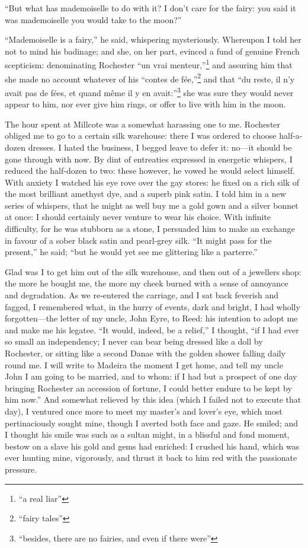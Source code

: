 \enquote{But what has mademoiselle to do with it?  I don't care for the
fairy: you said it was mademoiselle you would take to the moon?}

\enquote{Mademoiselle is a fairy,} he said, whispering mysteriously. 
Whereupon I told her not to mind his badinage; and she, on her part,
evinced a fund of genuine French scepticism: denominating \Mr{} Rochester
\foreignquote{french}{un vrai menteur,}\footnote{\enquote{a real liar}} and assuring him that she made no account
whatever of his \foreignquote{french}{contes de fée,}\footnote{\enquote{fairy tales}} and that \foreignquote{french}{du reste, il
n'y avait pas de fées, et quand même il y en avait:}\footnote{
\enquote{besides, there are no fairies, and even if there were}} she was sure they
would never appear to him, nor ever give him rings, or offer to live
with him in the moon.

The hour spent at Millcote was a somewhat harassing one to me.  \Mr{}
 Rochester obliged me to go to a certain silk warehouse: there I was
ordered to choose half-a-dozen dresses.  I hated the business, I begged
leave to defer it: no---it should be gone through with now.  By dint of
entreaties expressed in energetic whispers, I reduced the half-dozen to
two: these however, he vowed he would select himself.  With anxiety I
watched his eye rove over the gay stores: he fixed on a rich silk of the
most brilliant amethyst dye, and a superb pink satin.  I told him in a
new series of whispers, that he might as well buy me a gold gown and a
silver bonnet at once: I should certainly never venture to wear his
choice.  With infinite difficulty, for he was stubborn as a stone, I
persuaded him to make an exchange in favour of a sober black satin and
pearl-grey silk.  \enquote{It might pass for the present,} he said;
\enquote{but he would yet see me glittering like a parterre.}

Glad was I to get him out of the silk warehouse, and then out of a
jewellers shop: the more he bought me, the more my cheek burned with a
sense of annoyance and degradation.  As we re-entered the carriage, and
I sat back feverish and fagged, I remembered what, in the hurry of
events, dark and bright, I had wholly forgotten---the letter of my
uncle, John Eyre, to \Mrs{} Reed: his intention to adopt me and make me
his legatee.  \enquote{It would, indeed, be a relief,} I thought,
\enquote{if I had ever so small an independency; I never can bear being
dressed like a doll by \Mr{} Rochester, or sitting like a second Danae
with the golden shower falling daily round me.  I will write to Madeira
the moment I get home, and tell my uncle John I am going to be married,
and to whom: if I had but a prospect of one day bringing \Mr{} Rochester
an accession of fortune, I could better endure to be kept by him now.} 
And somewhat relieved by this idea (which I failed not to execute that
day), I ventured once more to meet my master's and lover's eye, which
most pertinaciously sought mine, though I averted both face and gaze. 
He smiled; and I thought his smile was such as a sultan might, in a
blissful and fond moment, bestow on a slave his gold and gems had
enriched: I crushed his hand, which was ever hunting mine, vigorously,
and thrust it back to him red with the passionate pressure.

